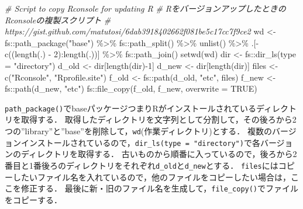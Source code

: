 \documentclass[
]{article}
\newenvironment{Shaded}{\begin{snugshade}}{\end{snugshade}}
\newcommand{\AttributeTok}[1]{\textcolor[rgb]{0.77,0.63,0.00}{#1}}
\newcommand{\CommentTok}[1]{\textcolor[rgb]{0.56,0.35,0.01}{\textit{#1}}}
\newcommand{\ConstantTok}[1]{\textcolor[rgb]{0.00,0.00,0.00}{#1}}
\newcommand{\DecValTok}[1]{\textcolor[rgb]{0.00,0.00,0.81}{#1}}
\newcommand{\FunctionTok}[1]{\textcolor[rgb]{0.00,0.00,0.00}{#1}}
\newcommand{\NormalTok}[1]{#1}
\newcommand{\OtherTok}[1]{\textcolor[rgb]{0.56,0.35,0.01}{#1}}
\newcommand{\SpecialCharTok}[1]{\textcolor[rgb]{0.00,0.00,0.00}{#1}}
\newcommand{\StringTok}[1]{\textcolor[rgb]{0.31,0.60,0.02}{#1}}
\begin{document}
\begin{Shaded}
\begin{Highlighting}[]
  \CommentTok{\# Script to copy Rconsole for updating R}
  \CommentTok{\# RをバージョンアップしたときのRconsoleの複製スクリプト}
  \CommentTok{\#   https://gist.github.com/matutosi/6dab3918402662f081be5c17cc7f9ce2}
\NormalTok{wd }\OtherTok{\textless{}{-}} 
\NormalTok{  fs}\SpecialCharTok{::}\FunctionTok{path\_package}\NormalTok{(}\StringTok{"base"}\NormalTok{) }\SpecialCharTok{\%\textgreater{}\%}
\NormalTok{  fs}\SpecialCharTok{::}\FunctionTok{path\_split}\NormalTok{() }\SpecialCharTok{\%\textgreater{}\%}
  \FunctionTok{unlist}\NormalTok{() }\SpecialCharTok{\%\textgreater{}\%}
\NormalTok{  .[}\SpecialCharTok{{-}}\FunctionTok{c}\NormalTok{((}\FunctionTok{length}\NormalTok{(.) }\SpecialCharTok{{-}} \DecValTok{2}\NormalTok{)}\SpecialCharTok{:}\FunctionTok{length}\NormalTok{(.))] }\SpecialCharTok{\%\textgreater{}\%}
\NormalTok{  fs}\SpecialCharTok{::}\FunctionTok{path\_join}\NormalTok{()  }
\FunctionTok{setwd}\NormalTok{(wd)}
\NormalTok{dir }\OtherTok{\textless{}{-}}\NormalTok{ fs}\SpecialCharTok{::}\FunctionTok{dir\_ls}\NormalTok{(}\AttributeTok{type =} \StringTok{"directory"}\NormalTok{)}
\NormalTok{d\_old }\OtherTok{\textless{}{-}}\NormalTok{ dir[}\FunctionTok{length}\NormalTok{(dir)}\SpecialCharTok{{-}}\DecValTok{1}\NormalTok{]}
\NormalTok{d\_new }\OtherTok{\textless{}{-}}\NormalTok{ dir[}\FunctionTok{length}\NormalTok{(dir)]}
\NormalTok{files }\OtherTok{\textless{}{-}} \FunctionTok{c}\NormalTok{(}\StringTok{"Rconsole"}\NormalTok{, }\StringTok{"Rprofile.site"}\NormalTok{)}
\NormalTok{f\_old }\OtherTok{\textless{}{-}}\NormalTok{ fs}\SpecialCharTok{::}\FunctionTok{path}\NormalTok{(d\_old, }\StringTok{"etc"}\NormalTok{, files)}
\NormalTok{f\_new }\OtherTok{\textless{}{-}}\NormalTok{ fs}\SpecialCharTok{::}\FunctionTok{path}\NormalTok{(d\_new, }\StringTok{"etc"}\NormalTok{)}
\NormalTok{fs}\SpecialCharTok{::}\FunctionTok{file\_copy}\NormalTok{(f\_old, f\_new, }\AttributeTok{overwrite =} \ConstantTok{TRUE}\NormalTok{)}
\end{Highlighting}
\end{Shaded}

\texttt{path\_package()}でbaseパッケージつまりRがインストールされているディレクトリを取得する．
取得したディレクトリを文字列として分割して，その後ろから2つの''library''と''base''を削除して，\texttt{wd}(作業ディレクトリ)とする．
複数のバージョンインストールされているので，\texttt{dir\_ls(type\ =\ "directory")}で各バージョンのディレクトリを取得する．
古いものから順番に入っているので，後ろから2番目と1番後ろのディレクトリをそれぞれ\texttt{d\_old}と\texttt{d\_new}とする．
\texttt{files}にはコピーしたいファイル名を入れているので，他のファイルをコピーしたい場合は，ここを修正する．
最後に新・旧のファイル名を生成して，\texttt{file\_copy()}でファイルをコピーする．
\end{document}
